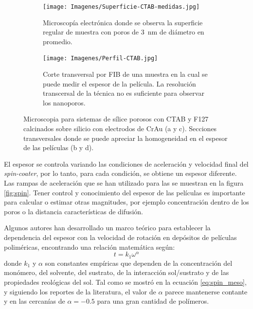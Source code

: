 \begin{figure}[bh!]
\begin{subfigure}[t]{0.495\textwidth}
			       		\label{fig:sem_homogeneidad2}
			       		\end{subfigure}	
			       	\begin{subfigure}[t]{0.495\textwidth}
			        	\texttt{[image: Imagenes/Superficie-CTAB-medidas.jpg]}
			       		\caption{Microscopía electrónica donde se observa la superficie regular de muestra \pdmC\space con poros de \SI{3}{nm} de diámetro en promedio.}
			       		\label{fig:sem_homogeneidad3}
			       		\end{subfigure}
					\begin{subfigure}[t]{0.49\textwidth}
			 	   	    \texttt{[image: Imagenes/Perfil-CTAB.jpg]}
			       		\caption{Corte transversal por FIB de una muestra \pdmC\space en la cual se puede medir el espesor de la película. La resolución transcersal de la técnica no es suficiente para observar los nanoporos.}
			       		\label{fig:sem_homogeneidad4}
			       		\end{subfigure}	
					
					\vspace{-2mm}
					 \caption[MEB \pdmC\space y \pdmF.]{Microscopia para sistemas de sílice porosos con CTAB y F127 calcinados sobre silicio con electrodos de Cr\textbar Au (a y c). Secciones transversales donde se puede apreciar la homogeneidad en el espesor de las películas (b y d).}
					 \label{fig:sem_homogeneidad}	
				     \vspace*{0.2cm}
				     \end{figure}
 	
		 El espesor se controla variando las condiciones de aceleración y velocidad final del \textit{spin-coater}, por lo tanto, para cada condición, se obtiene un espesor diferente. Las rampas de aceleración que se han utilizado para las \pdm\space se muestran en la figura \ref{fig:spin}. Tener control y conocimiento del espesor de las películas es importante para calcular o estimar otras magnitudes, por ejemplo concentración dentro de los poros o la distancia características de difusión. 

		 Algunos autores han desarrollado un marco teórico para establecer la dependencia del espesor con la velocidad de rotación en depósitos de películas poliméricas, encontrando una relación matemática según: \cite{Norrman2005,Meyerhofer1978,Bornside1989,Lora1990}
			\begin{equation}
			  t = k_1 \omega^{\alpha}
			  \label{eq:spin_meso}
			  \end{equation}		
		donde $k_1$ y $\alpha$ son constantes empíricas que dependen de la concentración del monómero, del solvente, del sustrato, de la interacción sol/sustrato y  de las propiedades reológicas del sol. Tal como se mostró en la ecuación \ref{eq:spin_meso}, y siguiendo los reportes de la literatura, el valor de $\alpha$ parece mantenerse contante y en las cercanías de $\alpha=-0.5$ para una gran cantidad de polímeros. 

